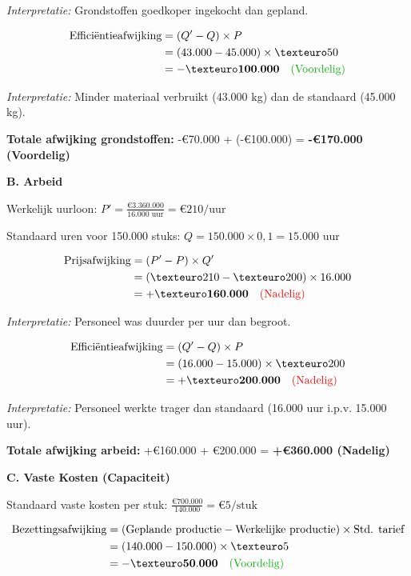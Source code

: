 \documentclass[a4paper,11pt]{article}
\begin{document}
\begin{oefenblok}[title=Afwijkingsanalyse - Begroting vs Realisatie]
    \textit{Interpretatie:} Grondstoffen goedkoper ingekocht dan gepland.
    
    \begin{align*}
    \text{Efficiëntieafwijking} &= (Q' - Q) \times P \\
    &= (43.000 - 45.000) \times €50 \\
    &= \mathbf{-€100.000} \quad \text{\textcolor{green!70!black}{(Voordelig)}}
    \end{align*}
    
    \textit{Interpretatie:} Minder materiaal verbruikt (43.000 kg) dan de standaard (45.000 kg).
    
    \textbf{Totale afwijking grondstoffen:} -€70.000 + (-€100.000) = \textbf{-€170.000 (Voordelig)}
    
    \textbf{B. Arbeid}
    
    Werkelijk uurloon: $P' = \frac{€3.360.000}{16.000\text{ uur}} = €210/\text{uur}$
    
    Standaard uren voor 150.000 stuks: $Q = 150.000 \times 0,1 = 15.000$ uur
    
    \begin{align*}
    \text{Prijsafwijking} &= (P' - P) \times Q' \\
    &= (€210 - €200) \times 16.000 \\
    &= \mathbf{+€160.000} \quad \text{\textcolor{red}{(Nadelig)}}
    \end{align*}
    
    \textit{Interpretatie:} Personeel was duurder per uur dan begroot.
    
    \begin{align*}
    \text{Efficiëntieafwijking} &= (Q' - Q) \times P \\
    &= (16.000 - 15.000) \times €200 \\
    &= \mathbf{+€200.000} \quad \text{\textcolor{red}{(Nadelig)}}
    \end{align*}
    
    \textit{Interpretatie:} Personeel werkte trager dan standaard (16.000 uur i.p.v. 15.000 uur).
    
    \textbf{Totale afwijking arbeid:} +€160.000 + €200.000 = \textbf{+€360.000 (Nadelig)}
    
    \textbf{C. Vaste Kosten (Capaciteit)}
    
    Standaard vaste kosten per stuk: $\frac{€700.000}{140.000} = €5/\text{stuk}$
    
    \begin{align*}
    \text{Bezettingsafwijking} &= (\text{Geplande productie} - \text{Werkelijke productie}) \times \text{Std. tarief} \\
    &= (140.000 - 150.000) \times €5 \\
    &= \mathbf{-€50.000} \quad \text{\textcolor{green!70!black}{(Voordelig)}}
    \end{align*}
    

\end{oefenblok}
\end{document}
